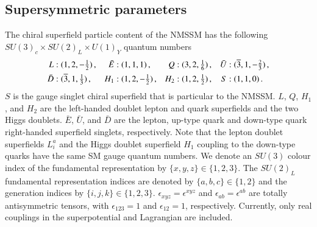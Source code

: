 \documentclass[final,3p,times]{elsarticle}
\begin{document}
\subsection{Supersymmetric parameters \label{susypars}}
The chiral superfield particle content of the NMSSM has the 
following $SU(3)_c\times SU(2)_L\times U(1)_Y$ quantum numbers
\begin{align}
L&:(1,2,-\tfrac{1}{2})\,, & \bar{E}&:(1,1,1)\,, & 
Q&:(3,2,\tfrac{1}{6})\,,  & \bar{U}&:(\overline 3,1,-\tfrac{2}{3})\,, \notag \\
\bar{D}&:(\overline 3,1,\tfrac{1}{3})\,, & H_1&:(1,2,-\tfrac{1}{2})\,, & 
H_2&:(1,2,\tfrac{1}{2})\,, & S&:(1,1,0)\,.
\label{fields}
\end{align}
$S$ is the gauge singlet chiral superfield that is particular to the NMSSM. 
$L$, $Q$, $H_1$, and $H_2$ are the left-handed doublet lepton and quark 
superfields and the two Higgs doublets. $\bar{E}$, $\bar{U}$, and $\bar{D}$ are 
the lepton, up-type quark and down-type quark right-handed superfield singlets, 
respectively. Note that the lepton doublet superfields $L^a_i$ and the Higgs 
doublet superfield $H_1$ coupling to the down-type quarks have the same 
SM gauge quantum numbers. We denote an $SU(3)$ colour 
index of the fundamental representation by  $\{x,y,z\} \in \{1,2,3 \}$. The 
$SU(2)_L$ fundamental representation indices are denoted by 
$\{a,b,c\} \in \{1,2\}$ and the generation indices by $\{i,j,k\} \in \{1,2,3\}$.
 $\epsilon_{xyz}=\epsilon^{xyz}$ and  $\epsilon_{ab}=\epsilon^{ab}$ are totally
antisymmetric tensors, with $\epsilon_{123}=1$ and $\epsilon_{12}=1$, 
respectively.  Currently, only real couplings in the superpotential and Lagrangian are 
included. 
\end{document}
